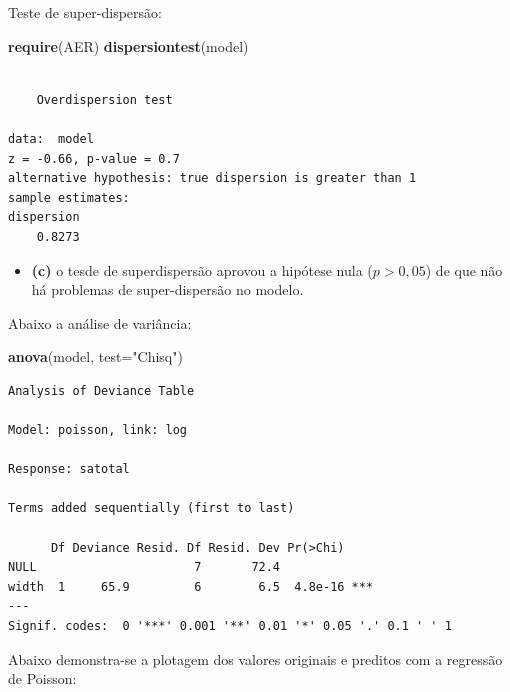 \documentclass[12pt,brazil,oneside]{book}
\newenvironment{Shaded}{\begin{snugshade}}{\end{snugshade}}
\newcommand{\DataTypeTok}[1]{\textcolor[rgb]{0.13,0.29,0.53}{#1}}
\newcommand{\KeywordTok}[1]{\textcolor[rgb]{0.13,0.29,0.53}{\textbf{#1}}}
\newcommand{\NormalTok}[1]{#1}
\newcommand{\StringTok}[1]{\textcolor[rgb]{0.31,0.60,0.02}{#1}}
\providecommand{\tightlist}{%
  \setlength{\itemsep}{0pt}\setlength{\parskip}{0pt}}
\begin{document}
Teste de super-dispersão:

\begin{Shaded}
\begin{Highlighting}[]
\KeywordTok{require}\NormalTok{(AER)}
\KeywordTok{dispersiontest}\NormalTok{(model)}
\end{Highlighting}
\end{Shaded}

\begin{verbatim}

    Overdispersion test

data:  model
z = -0.66, p-value = 0.7
alternative hypothesis: true dispersion is greater than 1
sample estimates:
dispersion 
    0.8273 
\end{verbatim}

\begin{itemize}
\tightlist
\item
  \textbf{(c)} o tesde de superdispersão aprovou a hipótese nula (\(p>0,05\)) de que não há problemas de super-dispersão no modelo.
\end{itemize}

Abaixo a análise de variância:

\begin{Shaded}
\begin{Highlighting}[]
\KeywordTok{anova}\NormalTok{(model, }\DataTypeTok{test=}\StringTok{"Chisq"}\NormalTok{)}
\end{Highlighting}
\end{Shaded}

\begin{verbatim}
Analysis of Deviance Table

Model: poisson, link: log

Response: satotal

Terms added sequentially (first to last)

      Df Deviance Resid. Df Resid. Dev Pr(>Chi)    
NULL                      7       72.4             
width  1     65.9         6        6.5  4.8e-16 ***
---
Signif. codes:  0 '***' 0.001 '**' 0.01 '*' 0.05 '.' 0.1 ' ' 1
\end{verbatim}

Abaixo demonstra-se a plotagem dos valores originais e preditos com a regressão de Poisson:
\end{document}
